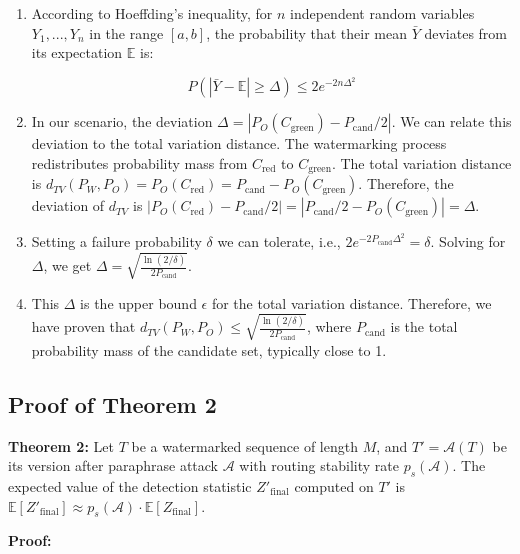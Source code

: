 \documentclass[letterpaper,twocolumn,10pt]{article}
\begin{document}
\begin{enumerate}
\item According to Hoeffding's inequality, for $n$ independent random variables $Y_1,..., Y_n$ in the range $[a,b]$, the probability that their mean $\bar{Y}$ deviates from its expectation $\mathbb{E}$ is:

\begin{equation}
P(|\bar{Y} - \mathbb{E}| \ge \Delta) \le 2e^{-2n\Delta^2}
\end{equation}

\item In our scenario, the deviation $\Delta = |P_O(C_{\text{green}}) - P_{\text{cand}}/2|$. We can relate this deviation to the total variation distance. The watermarking process redistributes probability mass from $C_{\text{red}}$ to $C_{\text{green}}$. The total variation distance is $d_{TV}(P_W, P_O) = P_O(C_{\text{red}}) = P_{\text{cand}} - P_O(C_{\text{green}})$. Therefore, the deviation of $d_{TV}$ is $|P_O(C_{\text{red}}) - P_{\text{cand}}/2| = |P_{\text{cand}}/2 - P_O(C_{\text{green}})| = \Delta$.

\item Setting a failure probability $\delta$ we can tolerate, i.e., $2e^{-2P_{\text{cand}}\Delta^2} = \delta$. Solving for $\Delta$, we get $\Delta = \sqrt{\frac{\ln(2/\delta)}{2 P_{\text{cand}}}}$.

\item This $\Delta$ is the upper bound $\epsilon$ for the total variation distance. Therefore, we have proven that $d_{TV}(P_W, P_O) \le \sqrt{\frac{\ln(2/\delta)}{2 P_{\text{cand}}}}$, where $P_{\text{cand}}$ is the total probability mass of the candidate set, typically close to 1.
\end{enumerate}

\subsection{Proof of Theorem 2}

\textbf{Theorem 2:} Let $T$ be a watermarked sequence of length $M$, and $T' = \mathcal{A}(T)$ be its version after paraphrase attack $\mathcal{A}$ with routing stability rate $p_s(\mathcal{A})$. The expected value of the detection statistic $Z'_{\text{final}}$ computed on $T'$ is $\mathbb{E}[Z'_{\text{final}}] \approx p_s(\mathcal{A}) \cdot \mathbb{E}[Z_{\text{final}}]$.

\textbf{Proof:}
\end{document}
